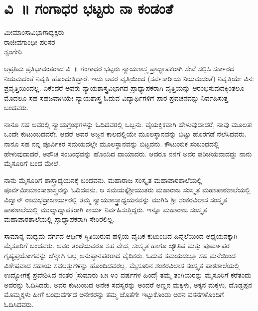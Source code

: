 {\fontsize{14}{16}\selectfont
\chapter{ವಿ~॥ ಗಂಗಾಧರ ಭಟ್ಟರು ನಾ ಕಂಡಂತೆ}

\begin{center}
\smallskip

ಮೀಮಾಂಸಾವಿಭಾಗಾಧ್ಯಕ್ಷರು\\   
ರಾಜೀವಗಾಂಧೀ ಪರಿಸರ\\
ಶೃಂಗೇರಿ
\addrule	
\end{center}

ಅಪ್ರತಿಮ ಪ್ರತಿಭಾವಂತರಾದ ವಿ~॥ ಗಂಗಾಧರ ಭಟ್ಟರು ನ್ಯಾಯಶಾಸ್ತ್ರ ಪ್ರಾಧ್ಯಾಪಕ\-ರಾಗಿ ಸೇವೆ ಸಲ್ಲಿಸಿ ಸರ್ಕಾರದ ನಿಯಮದಂತೆ ನಿವೃತ್ತಿ ಹೊಂದುತ್ತಿದ್ದಾರೆ. ಇದು ಅವರ ವೃತ್ತಿಯಿಂದ (ಸರ್ವಕಾರೀಯ ನಿಯಮದಂತೆ) ನಿವೃತ್ತಿಯೇ ವಿನಃ ಪ್ರವೃತ್ತಿಯಿಂದಲ್ಲ. ಏಕೆಂದರೆ   \enginline{-}   ಅವರು ನ್ಯಾಯಶಾಸ್ತ್ರವಿಭಾಗದ ಪ್ರಾಧ್ಯಾಪಕರಾಗಿ ವೃತ್ತಿಯನ್ನು ಆರಂಭಿಸುವು\-ದಕ್ಕಿಂತಲೂ ಮೊದಲೂ ಸಹ ಸಹಜವಾಗಿಯೇ ನ್ಯಾಯಶಾಸ್ತ್ರ ಓದುವ ವಿದ್ಯಾರ್ಥಿಗಳಿಗೆ ಪಾಠ  \enginline{-}  ಪ್ರವಚನವನ್ನು ನಿರ್ವಹಿಸುತ್ತ ಬಂದವರು.

ನಾನೂ ಸಹ ಅವರಲ್ಲಿ ನ್ಯಾಯಗ್ರಂಥಗಳನ್ನು ಓದಿದವರಲ್ಲಿ ಒಬ್ಬನು. ವೈಯಕ್ತಿಕವಾಗಿ ಹೇಳುವುದಾದರೆ, ನಾವು ಮೂಲತಃ ಒಂದೇ ಕುಟುಂಬದವರೇ. ಆದರೆ ಅವರ ಅಜ್ಜನ ಕಾಲದಲ್ಲಿಯೇ ಮೂಲಸ್ಥಾನವನ್ನು ಬಿಟ್ಟು ಹೊರಗಡೆ ನೆಲೆಸಿದವರು. ನಾನೂ ಸಹ ನನ್ನ ಪೂರ್ವಿಕರ ಸಮಯದಲ್ಲೇ ಮೂಲಸ್ಥಾನವನ್ನು ಬಿಟ್ಟವನು. ಕೌಟುಂಬಿಕ ಸಂಬಂಧದಲ್ಲಿ ಹೇಳುವುದಾದರೆ, ಅಶೌಚ ಸಂಬಂಧವನ್ನು ಹೊಂದಿದ ದಾಯಾದರು. ಆದರೂ ನನಗೆ ಅವರ ಪರಿಚಯವಾದದ್ದು ನಾನು ಮೈಸೂರಿಗೆ ಬಂದ ಮೇಲೆ.

ನಾನು ಮೈಸೂರಿಗೆ ಶಾಸ್ತ್ರಾಧ್ಯಯನಕ್ಕೆ ಬಂದವನು. ಮಹಾರಾಜ ಸಂಸ್ಕೃತ ಮಹಾ\-ಪಾಠಶಾಲೆಯಲ್ಲಿ ಪೂರ್ವಮೀಮಾಂಸಾಶಾಸ್ತ್ರವನ್ನು ಓದಿದವನು. ಆ ಸಮಯಕ್ಕೆ\break  ಶ್ರೀಯುತರು ಮಹಾರಾಜ ಸಂಸ್ಕೃತ ಮಹಾಪಾಠಶಾಲೆಯಲ್ಲಿ ವಿದ್ವಾನ್ ರಾಮ\-ಭದ್ರಾಚಾರ್ಯರಲ್ಲಿ ತಮ್ಮ ನ್ಯಾಯಶಾಸ್ತ್ರಾಧ್ಯಯನವನ್ನು ಮುಗಿಸಿ ಶ್ರೀ ಶಂಕರವಿಲಾಸ ಸಂಸ್ಕೃತ ಪಾಠಶಾಲೆಯಲ್ಲಿ ಮುಖ್ಯಾಧ್ಯಾಪಕರಾಗಿ ಕಾರ್ಯ ನಿರ್ವಹಿಸುತ್ತಿದ್ದರು. ಇನ್ನೂ ಮಹಾರಾಜ ಸಂಸ್ಕೃತ ಮಹಾಪಾಠಶಾಲೆಯಲ್ಲಿ ಪ್ರಾಧ್ಯಾಪಕರಾಗಿ ಸೇರಿರಲಿಲ್ಲ.

ಸಾಮಾನ್ಯ ಮಧ್ಯಮ ವರ್ಗದ ಆರ್ಥಿಕ ಸ್ಥಿತಿಯಿರುವ ಹಳ್ಳಿಯ ವೈದಿಕ ಕುಟುಂಬದ ಹಿನ್ನೆಲೆಯಿಂದ ಅಧ್ಯಯನಕ್ಕಾಗಿ ಮೈಸೂರಿಗೆ ಬಂದವರು. ಅವರ ತಂದೆಯವರೂ ಸಹ ವೇದ, ಸಂಸ್ಕೃತ ಹಾಗೂ ಜ್ಯೌತಿಷ ಮತ್ತು ಪೂರ್ವಾಪರ ಗೃಹ್ಯಪ್ರಯೋಗವನ್ನು ಚೆನ್ನಾಗಿ ಬಲ್ಲ ಅನುಷ್ಠಾನಪರರಾದ ವೈದಿಕರು. ಓದುವ ಸಮಯದಲ್ಲೂ ಸಹ ಮನೆಯಿಂದ ವಿಶೇಷ\-ವಾದ ಸಹಾಯ  \enginline{-}  ಸವಲತ್ತುಗಳನ್ನು ಹೊಂದಿದವರಲ್ಲ. ಮೈಸೂರಿನ ಶಂಕರ\-ವಿಲಾಸ ಸಂಸ್ಕೃತ ಪಾಠಶಾಲೆಯಲ್ಲಿ ಉದ್ಯೋಗಕ್ಕೆ ಪ್ರವೇಶಿಸಿದ ನಂತರ [ಸುಮಾರು ೩೫  \enginline{-}  ೪೦ ವರ್ಷಗಳ ಹಿಂದೆ] ತಮ್ಮ ತಂಗಿಯರನ್ನು ಮೈಸೂರಿಗೆ ಕರೆತಂದು ಅವರನ್ನು ಓದಿಸಿದರು. ಅವರ ಕುಟುಂಬದ ಅನೇಕ ಸದಸ್ಯರನ್ನು ಅಂದರೆ ಅಣ್ಣನ ಮಕ್ಕಳು, ಅಕ್ಕನ ಮಕ್ಕಳು, ದೊಡ್ದಪ್ಪನ ಮೊಮ್ಮಕ್ಕಳು ಹೀಗೆ ಬಂಧುವರ್ಗದ ಅನೇಕರನ್ನು ತಮ್ಮ ಜೊತೆಗೇ ಇಟ್ಟುಕೊಂಡು ಅಶನ  \enginline{-}  ವಸನಗಳೊಂದಿಗೆ ಓದಿಸಿದವರು.

}
